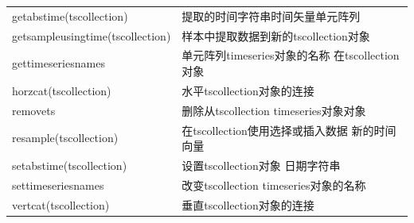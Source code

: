 \begin{longtable}{|l|l|}
            getabstime(tscollection) & 提取的时间字符串时间矢量单元阵列\\
            getsampleusingtime(tscollection) & 样本中提取数据到新的tscollection对象\\
            gettimeseriesnames & 单元阵列timeseries对象的名称 在tscollection对象\\
            horzcat(tscollection) &  水平tscollection对象的连接\\
            removets & 删除从tscollection timeseries对象对象\\
            resample(tscollection) & 在tscollection使用选择或插入数据 新的时间向量\\
            setabstime(tscollection)  &设置tscollection对象 日期字符串\\
            settimeseriesnames & 改变tscollection timeseries对象的名称\\
            vertcat(tscollection)  & 垂直tscollection对象的连接\\
            \hline
            \end{longtable}
